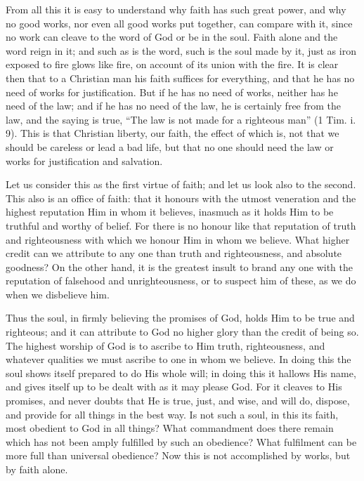 From all this it is easy to understand why faith has such great power, and
why no good works, nor even all good works put together, can compare with
it, since no work can cleave to the word of God or be in the soul. Faith
alone and the word reign in it; and such as is the word, such is the soul
made by it, just as iron exposed to fire glows like fire, on account of
its union with the fire. It is clear then that to a Christian man his
faith suffices for everything, and that he has no need of works for
justification. But if he has no need of works, neither has he need of the
law; and if he has no need of the law, he is certainly free from the law,
and the saying is true, ``The law is not made for a righteous man'' (1 Tim.
i. 9). This is that Christian liberty, our faith, the effect of which is,
not that we should be careless or lead a bad life, but that no one should
need the law or works for justification and salvation.

Let us consider this as the first virtue of faith; and let us look also to
the second. This also is an office of faith: that it honours with the
utmost veneration and the highest reputation Him in whom it believes,
inasmuch as it holds Him to be truthful and worthy of belief. For there is
no honour like that reputation of truth and righteousness with which we
honour Him in whom we believe. What higher credit can we attribute to any
one than truth and righteousness, and absolute goodness? On the other
hand, it is the greatest insult to brand any one with the reputation of
falsehood and unrighteousness, or to suspect him of these, as we do when
we disbelieve him.

Thus the soul, in firmly believing the promises of God, holds Him to be
true and righteous; and it can attribute to God no higher glory than the
credit of being so. The highest worship of God is to ascribe to Him truth,
righteousness, and whatever qualities we must ascribe to one in whom we
believe. In doing this the soul shows itself prepared to do His whole
will; in doing this it hallows His name, and gives itself up to be dealt
with as it may please God. For it cleaves to His promises, and never
doubts that He is true, just, and wise, and will do, dispose, and provide
for all things in the best way. Is not such a soul, in this its faith,
most obedient to God in all things? What commandment does there remain
which has not been amply fulfilled by such an obedience? What fulfilment
can be more full than universal obedience? Now this is not accomplished by
works, but by faith alone.

